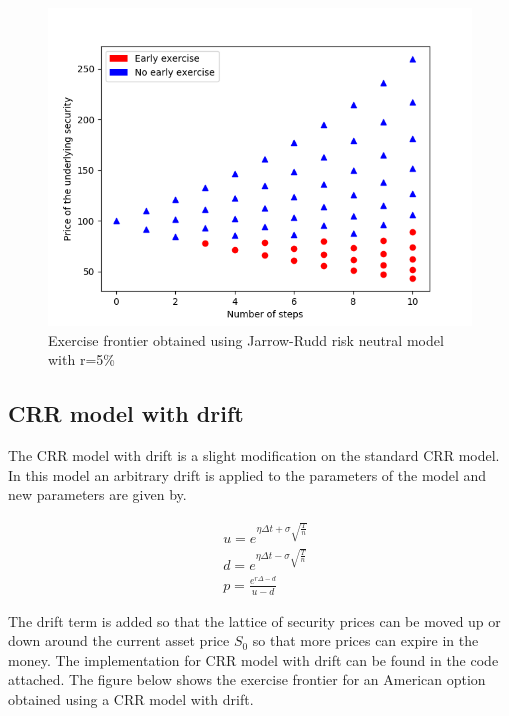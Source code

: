 \documentclass[12pt]{report}
\begin{document}
\begin{figure}[H]
	\centering
	\includegraphics[scale=0.6]{plots/JRRisk}
	\caption{Exercise frontier obtained using Jarrow-Rudd risk neutral model with r=5\%}
\end{figure}


\subsection*{CRR model with drift}
The CRR model with drift is a slight modification on the standard CRR model. In this model an arbitrary drift is applied to the parameters of the model and new parameters are given by.

\begin{equation*}
	\begin{aligned}
		&u = e^{\eta\Delta t + \sigma \sqrt{\frac{T}{n}} } \\
		&d = e^{\eta\Delta t -\sigma \sqrt{\frac{T}{n}} } \\
		&p = \frac{e^{r\Delta -d}}{u - d}
	\end{aligned}
\end{equation*}

The drift term is added so that the lattice of security prices can be moved up or down around the current asset price $S_0$ so that more prices can expire in the money. The implementation for CRR model with drift can be found in the code attached. The figure below shows the exercise frontier for an American option obtained using a CRR model with drift.
\end{document}
